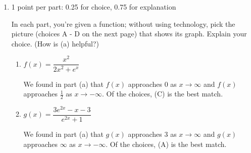 \documentclass{article}
\begin{document}
\begin{enumerate}
\begin{enumerate}
\begin{enumerate}
    \end{enumerate}

  \item

    \begin{grading}
      1 point per part: 0.25 for choice, 0.75 for explanation
    \end{grading}

    In each part, you're given a function; without using technology, pick the picture (choices A - D on the next page) that shows its graph. Explain your choice. (How is (a) helpful?)

    \begin{enumerate}
    \item
      \begin{problem}[\nstretch{0.75}]
        $f(x) = \dfrac{x^2}{2x^2 + e^x}$
      \end{problem}
      \begin{solution}
        We found in part (a) that $f(x)$ approaches $0$
        as $x \to \infty$ and $f(x)$ approaches $\frac{1}{2}$
        as $x \to -\infty$. Of the choices, (C) is the best match.
      \end{solution}

    \item
      \begin{problem}[\vfill]
        $g(x) = \dfrac{3 e^{2x} - x - 3}{e^{2x} + 1}$
      \end{problem}
      \begin{solution}
        We found in part (a) that $g(x)$ approaches $3$
        as $x \to \infty$ and $g(x)$ approaches $\infty$
        as $x \to -\infty$. Of the choices, (A) is the best match.
      \end{solution}

    \end{enumerate}


\end{enumerate}
\end{enumerate}
\end{document}
